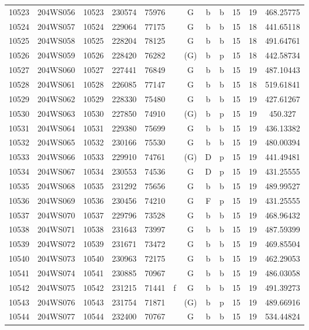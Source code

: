\begin{tabular}{|*{12}{c|}}
10523 & 204WS056 & 10523 & 230574 & 75976 &  & G & b & b & 15 & 19 & 468.25775 \\ 
10524 & 204WS057 & 10524 & 229064 & 77175 &  & G & b & b & 15 & 18 & 441.65118 \\ 
10525 & 204WS058 & 10525 & 228204 & 78125 &  & G & b & b & 15 & 18 & 491.64761 \\ 
10526 & 204WS059 & 10526 & 228420 & 76282 &  & (G) & b & p & 15 & 18 & 442.58734 \\ 
10527 & 204WS060 & 10527 & 227441 & 76849 &  & G & b & b & 15 & 19 & 487.10443 \\ 
10528 & 204WS061 & 10528 & 226085 & 77147 &  & G & b & b & 15 & 18 & 519.61841 \\ 
10529 & 204WS062 & 10529 & 228330 & 75480 &  & G & b & b & 15 & 19 & 427.61267 \\ 
10530 & 204WS063 & 10530 & 227850 & 74910 &  & (G) & b & p & 15 & 19 & 450.327 \\ 
10531 & 204WS064 & 10531 & 229380 & 75699 &  & G & b & b & 15 & 19 & 436.13382 \\ 
10532 & 204WS065 & 10532 & 230166 & 75530 &  & G & b & b & 15 & 19 & 480.00394 \\ 
10533 & 204WS066 & 10533 & 229910 & 74761 &  & (G) & D & p & 15 & 19 & 441.49481 \\ 
10534 & 204WS067 & 10534 & 230553 & 74536 &  & G & D & p & 15 & 19 & 431.25555 \\ 
10535 & 204WS068 & 10535 & 231292 & 75656 &  & G & b & b & 15 & 19 & 489.99527 \\ 
10536 & 204WS069 & 10536 & 230456 & 74210 &  & G & F & p & 15 & 19 & 431.25555 \\ 
10537 & 204WS070 & 10537 & 229796 & 73528 &  & G & b & b & 15 & 19 & 468.96432 \\ 
10538 & 204WS071 & 10538 & 231643 & 73997 &  & G & b & b & 15 & 19 & 487.59399 \\ 
10539 & 204WS072 & 10539 & 231671 & 73472 &  & G & b & b & 15 & 19 & 469.85504 \\ 
10540 & 204WS073 & 10540 & 230963 & 72175 &  & G & b & b & 15 & 19 & 462.29053 \\ 
10541 & 204WS074 & 10541 & 230885 & 70967 &  & G & b & b & 15 & 19 & 486.03058 \\ 
10542 & 204WS075 & 10542 & 231215 & 71441 & f & G & b & b & 15 & 19 & 491.39273 \\ 
10543 & 204WS076 & 10543 & 231754 & 71871 &  & (G) & b & p & 15 & 19 & 489.66916 \\ 
10544 & 204WS077 & 10544 & 232400 & 70767 &  & G & b & b & 15 & 19 & 534.44824 \\ 

\end{tabular}

